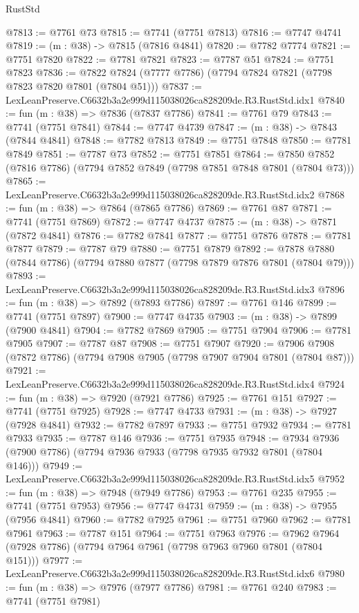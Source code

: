 \begin{lexlean}{RustStd}
\begin{coremodule}
@7813 := @7761 @73
@7815 := @7741 (@7751 @7813)
@7816 := @7747 @4741
@7819 := (m : @38) -> @7815 (@7816 @4841)
@7820 := @7782 @7774
@7821 := @7751 @7820
@7822 := @7781 @7821
@7823 := @7787 @51
@7824 := @7751 @7823
@7836 := @7822 @7824 (@7777 @7786) (@7794 @7824 @7821 (@7798 @7823 @7820 @7801 (@7804 @51)))
@7837 := LexLeanPreserve.C6632b3a2e999d115038026ca828209de.R3.RustStd.idx1
@7840 := fun (m : @38) => @7836 (@7837 @7786)
@7841 := @7761 @79
@7843 := @7741 (@7751 @7841)
@7844 := @7747 @4739
@7847 := (m : @38) -> @7843 (@7844 @4841)
@7848 := @7782 @7813
@7849 := @7751 @7848
@7850 := @7781 @7849
@7851 := @7787 @73
@7852 := @7751 @7851
@7864 := @7850 @7852 (@7816 @7786) (@7794 @7852 @7849 (@7798 @7851 @7848 @7801 (@7804 @73)))
@7865 := LexLeanPreserve.C6632b3a2e999d115038026ca828209de.R3.RustStd.idx2
@7868 := fun (m : @38) => @7864 (@7865 @7786)
@7869 := @7761 @87
@7871 := @7741 (@7751 @7869)
@7872 := @7747 @4737
@7875 := (m : @38) -> @7871 (@7872 @4841)
@7876 := @7782 @7841
@7877 := @7751 @7876
@7878 := @7781 @7877
@7879 := @7787 @79
@7880 := @7751 @7879
@7892 := @7878 @7880 (@7844 @7786) (@7794 @7880 @7877 (@7798 @7879 @7876 @7801 (@7804 @79)))
@7893 := LexLeanPreserve.C6632b3a2e999d115038026ca828209de.R3.RustStd.idx3
@7896 := fun (m : @38) => @7892 (@7893 @7786)
@7897 := @7761 @146
@7899 := @7741 (@7751 @7897)
@7900 := @7747 @4735
@7903 := (m : @38) -> @7899 (@7900 @4841)
@7904 := @7782 @7869
@7905 := @7751 @7904
@7906 := @7781 @7905
@7907 := @7787 @87
@7908 := @7751 @7907
@7920 := @7906 @7908 (@7872 @7786) (@7794 @7908 @7905 (@7798 @7907 @7904 @7801 (@7804 @87)))
@7921 := LexLeanPreserve.C6632b3a2e999d115038026ca828209de.R3.RustStd.idx4
@7924 := fun (m : @38) => @7920 (@7921 @7786)
@7925 := @7761 @151
@7927 := @7741 (@7751 @7925)
@7928 := @7747 @4733
@7931 := (m : @38) -> @7927 (@7928 @4841)
@7932 := @7782 @7897
@7933 := @7751 @7932
@7934 := @7781 @7933
@7935 := @7787 @146
@7936 := @7751 @7935
@7948 := @7934 @7936 (@7900 @7786) (@7794 @7936 @7933 (@7798 @7935 @7932 @7801 (@7804 @146)))
@7949 := LexLeanPreserve.C6632b3a2e999d115038026ca828209de.R3.RustStd.idx5
@7952 := fun (m : @38) => @7948 (@7949 @7786)
@7953 := @7761 @235
@7955 := @7741 (@7751 @7953)
@7956 := @7747 @4731
@7959 := (m : @38) -> @7955 (@7956 @4841)
@7960 := @7782 @7925
@7961 := @7751 @7960
@7962 := @7781 @7961
@7963 := @7787 @151
@7964 := @7751 @7963
@7976 := @7962 @7964 (@7928 @7786) (@7794 @7964 @7961 (@7798 @7963 @7960 @7801 (@7804 @151)))
@7977 := LexLeanPreserve.C6632b3a2e999d115038026ca828209de.R3.RustStd.idx6
@7980 := fun (m : @38) => @7976 (@7977 @7786)
@7981 := @7761 @240
@7983 := @7741 (@7751 @7981)

\end{coremodule}
\end{lexlean}
